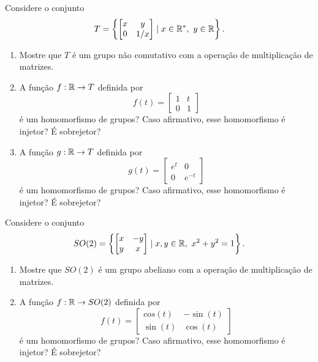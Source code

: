 \documentclass[12pt]{exam}
\begin{document}
    \vspace{.3cm}

    \questao{} Considere o conjunto
    \[
        T = \left\{\begin{bmatrix}x & y\\0 & 1/x\end{bmatrix} \mid x \in \mathbb{R}^*,\ y \in \mathbb{R}\right\}.
    \]
    \begin{enumerate}[label=({\alph*})]
        \item Mostre que $T$ é um grupo não comutativo com a operação de multiplicação de matrizes.

        \item A função $f : \mathbb{R} \to T$ definida por
            \[
                f(t) = \begin{bmatrix}1 & t\\0 & 1\end{bmatrix}
            \]
        é um homomorfismo de grupos? Caso afirmativo, esse homomorfismo é injetor? É sobrejetor?

        \item A função $g : \mathbb{R} \to T$ definida por
            \[
                g(t) = \begin{bmatrix}e^t & 0\\0 & e^{-t}\end{bmatrix}
            \]
        é um homomorfismo de grupos? Caso afirmativo, esse homomorfismo é injetor? É sobrejetor?
    \end{enumerate}

    \vspace{.3cm}

    \questao{} Considere o conjunto
    \[
        SO(2) = \left\{\begin{bmatrix}x & -y\\y & x\end{bmatrix} \mid x, y \in \mathbb{R},\ x^2 + y^2 = 1\right\}.
    \]
    \begin{enumerate}[label=({\alph*})]
        \item Mostre que $SO(2)$ é um grupo abeliano com a operação de multiplicação de matrizes.

        \item A função $f : \mathbb{R} \to SO(2)$ definida por
            \[
                f(t) = \begin{bmatrix}cos(t) & -\sin(t)\\\sin(t) & \cos(t)\end{bmatrix}
            \]
        é um homomorfismo de grupos? Caso afirmativo, esse homomorfismo é injetor? É sobrejetor?
    \end{enumerate}
\end{document}
